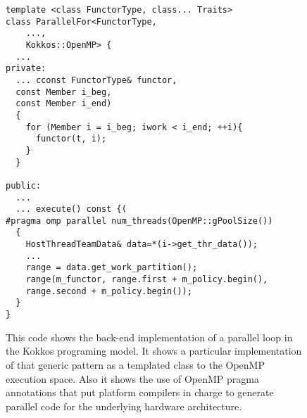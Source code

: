 \begin{figure}
\begin{small}
\begin{Verbatim}[frame=leftline]
template <class FunctorType, class... Traits>
class ParallelFor<FunctorType, 
    ..., 
    Kokkos::OpenMP> {
  ...
private:
  ... cconst FunctorType& functor, 
  const Member i_beg,
  const Member i_end) 
  {
    for (Member i = i_beg; iwork < i_end; ++i){
      functor(t, i);
    }
  }

public:
  ...
  ... execute() const {(
#pragma omp parallel num_threads(OpenMP::gPoolSize())
  {
    HostThreadTeamData& data=*(i->get_thr_data());
    ...
    range = data.get_work_partition();
    range(m_functor, range.first + m_policy.begin(),
    range.second + m_policy.begin());
  }
}

\end{Verbatim}
\end{small}
\caption{This code shows the back-end implementation of a parallel loop in the Kokkos programing model. It shows a particular implementation of that generic pattern as a templated class to the OpenMP execution space. Also it shows the use of OpenMP pragma annotations that put platform compilers in charge to generate parallel code for the underlying hardware architecture.}
\label{fig:KokkosExampleOMPBackEnd}
\end{figure}



